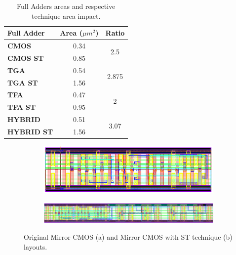 \documentclass[ecp,tc, english]{iiufrgs}
\begin{document}
\begin{table}[!htbp]
\centering
\caption{Full Adders areas and respective technique area impact.}
\label{penalties}
\begin{tabular}{lcc}
\hline
\textbf{Full Adder} & \textbf{Area (${\mu m}^2$)}    & \textbf{Ratio}         \\ \hline
\textbf{CMOS}       & 0.34             & \multirow{2}{*}{2.5}   \\ \cline{1-2}
\textbf{CMOS ST}    & 0.85             &                        \\ \hline
\textbf{TGA}        & 0.54             & \multirow{2}{*}{2.875} \\ \cline{1-2}
\textbf{TGA ST}     & 1.56             &                        \\ \hline
\textbf{TFA}        & 0.47             & \multirow{2}{*}{2}     \\ \cline{1-2}
\textbf{TFA ST}     & 0.95             &                        \\ \hline
\textbf{HYBRID}     & 0.51             & \multirow{2}{*}{3.07}  \\ \cline{1-2}
\textbf{HYBRID ST}  & 1.56             &                        \\ \hline
\end{tabular}
\end{table}

\begin{figure}[!h]
\centering
\begin{subfigure}[b]{\textwidth}
   \includegraphics[width=1\linewidth]{CMOS.png}
   \caption{}
   \label{fig:Ng1} 
\end{subfigure}

\begin{subfigure}[b]{\textwidth}
   \includegraphics[width=1\linewidth]{CMOSST.png}
   \caption{}
   \label{fig:Ng2}
\end{subfigure}
\caption{Original Mirror CMOS (a) and Mirror CMOS with ST technique (b) layouts.}
\label{CMOS}
\end{figure}
\end{document}
